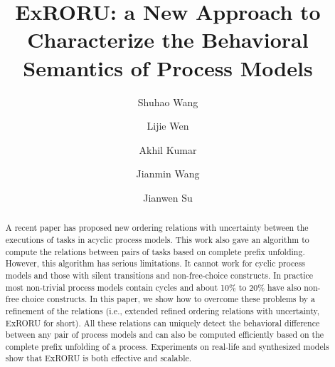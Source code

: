 \documentclass{llncs}
\begin{document}
\frontmatter 
\pagestyle{headings}

\mainmatter
\title{ExRORU: a New Approach to Characterize the Behavioral Semantics of Process Models}

\author[$1$]{Shuhao Wang}
\author[$1$]{Lijie Wen}
\author[$2$]{Akhil Kumar}
\author[$1$]{Jianmin Wang}
\author[$3$]{Jianwen Su}
\institute{}

\maketitle

\begin{abstract}
A recent paper has proposed new ordering relations with uncertainty between the executions of tasks in acyclic process models. This work also gave an algorithm to compute the relations between pairs of tasks based on complete prefix unfolding. However, this algorithm has serious limitations. It cannot work for cyclic process models and those with silent transitions and non-free-choice constructs. In practice most non-trivial process models contain cycles and about 10\% to 20\% have also non-free choice constructs. In this paper, we show how to overcome these problems by a refinement of the relations (i.e., extended refined ordering relations with uncertainty, ExRORU for short). All these relations can uniquely detect the behavioral difference between any pair of process models and can also be computed efficiently based on the complete prefix unfolding of a process. Experiments on real-life and synthesized models show that ExRORU is both effective and scalable.
\end{abstract}
\end{document}
